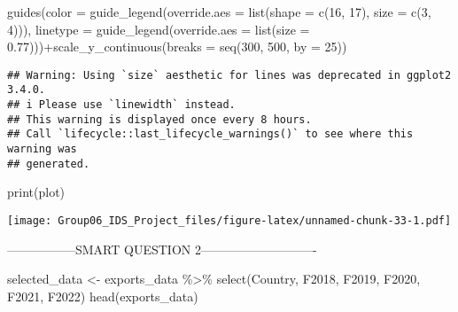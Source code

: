 \documentclass[
]{article}
\newenvironment{Shaded}{\begin{snugshade}}{\end{snugshade}}
\newcommand{\AttributeTok}[1]{\textcolor[rgb]{0.77,0.63,0.00}{#1}}
\newcommand{\DecValTok}[1]{\textcolor[rgb]{0.00,0.00,0.81}{#1}}
\newcommand{\FloatTok}[1]{\textcolor[rgb]{0.00,0.00,0.81}{#1}}
\newcommand{\FunctionTok}[1]{\textcolor[rgb]{0.00,0.00,0.00}{#1}}
\newcommand{\NormalTok}[1]{#1}
\newcommand{\OtherTok}[1]{\textcolor[rgb]{0.56,0.35,0.01}{#1}}
\newcommand{\SpecialCharTok}[1]{\textcolor[rgb]{0.00,0.00,0.00}{#1}}
\begin{document}
\begin{Shaded}
\begin{Highlighting}[]
  \FunctionTok{guides}\NormalTok{(}\AttributeTok{color =} \FunctionTok{guide\_legend}\NormalTok{(}\AttributeTok{override.aes =} \FunctionTok{list}\NormalTok{(}\AttributeTok{shape =} \FunctionTok{c}\NormalTok{(}\DecValTok{16}\NormalTok{, }\DecValTok{17}\NormalTok{), }\AttributeTok{size =} \FunctionTok{c}\NormalTok{(}\DecValTok{3}\NormalTok{, }\DecValTok{4}\NormalTok{))),}
         \AttributeTok{linetype =} \FunctionTok{guide\_legend}\NormalTok{(}\AttributeTok{override.aes =} \FunctionTok{list}\NormalTok{(}\AttributeTok{size =} \FloatTok{0.77}\NormalTok{)))}\SpecialCharTok{+}\FunctionTok{scale\_y\_continuous}\NormalTok{(}\AttributeTok{breaks =} \FunctionTok{seq}\NormalTok{(}\DecValTok{300}\NormalTok{, }\DecValTok{500}\NormalTok{, }\AttributeTok{by =} \DecValTok{25}\NormalTok{))}
\end{Highlighting}
\end{Shaded}

\begin{verbatim}
## Warning: Using `size` aesthetic for lines was deprecated in ggplot2 3.4.0.
## i Please use `linewidth` instead.
## This warning is displayed once every 8 hours.
## Call `lifecycle::last_lifecycle_warnings()` to see where this warning was
## generated.
\end{verbatim}

\begin{Shaded}
\begin{Highlighting}[]
\FunctionTok{print}\NormalTok{(plot)}
\end{Highlighting}
\end{Shaded}

\texttt{[image: Group06\_IDS\_Project\_files/figure-latex/unnamed-chunk-33-1.pdf]}

-----------------SMART QUESTION 2----------------------------

\begin{Shaded}
\begin{Highlighting}[]
\NormalTok{selected\_data }\OtherTok{\textless{}{-}}\NormalTok{ exports\_data }\SpecialCharTok{\%\textgreater{}\%}
  \FunctionTok{select}\NormalTok{(Country, F2018, F2019, F2020, F2021, F2022)}
\FunctionTok{head}\NormalTok{(exports\_data)}
\end{Highlighting}
\end{Shaded}
\end{document}
